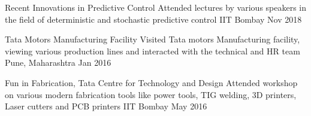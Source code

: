 

\begin{cvhonors}
	\cvhonor
		{Recent Innovations in Predictive Control}
		{Attended lectures by various speakers in the field of deterministic and stochastic predictive control}
		{IIT Bombay}
		{Nov 2018}

	\cvhonor
		{Tata Motors Manufacturing Facility}
		{Visited Tata motors Manufacturing facility, viewing various production lines and interacted with the technical and HR team}
		{Pune, Maharashtra}
		{Jan 2016}

	\cvhonor
		{Fun in Fabrication, Tata Centre for Technology and Design}
		{Attended workshop on various modern fabrication tools like power tools, TIG welding, 3D printers, Laser cutters and PCB printers}
		{IIT Bombay}
		{May 2016}

\end{cvhonors}
